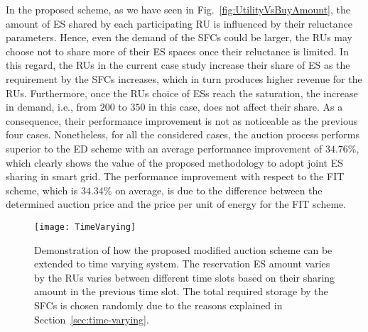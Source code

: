 \documentclass[journal,10pt]{IEEEtran}
\begin{document}
In the proposed scheme, as we have seen in Fig.~\ref{fig:UtilityVsBuyAmount}, the amount of ES shared by each participating RU is influenced by their reluctance parameters. Hence, even the demand of the SFCs could be larger, the RUs may choose not to share more of their ES spaces once their reluctance is limited. In this regard, the RUs in the current case study increase their share of ES as the requirement by the  SFCs increases, which in turn produces higher revenue for the RUs. Furthermore, once the RUs choice of ESs reach the saturation, the increase in demand, i.e., from $200$ to $350$ in this case, does not affect their share. As a consequence, their performance improvement is not as noticeable as the previous four cases. Nonetheless, for all the considered cases, the auction process performs superior to the ED scheme with an average performance improvement of $34.76\%$, which clearly shows the value of the proposed methodology to adopt joint ES sharing in smart grid. The performance improvement with respect to the FIT scheme, which is $34.34\%$ on average, is due to the difference between the determined auction price and the price per unit of energy for the FIT scheme.
\begin{figure}[t!]
\centering
\texttt{[image: TimeVarying]}
\caption{Demonstration of how the proposed modified auction scheme can be extended to time varying system. The reservation ES amount varies by the RUs varies between different time slots based on their sharing amount in the previous time slot. The total required storage by the SFCs is chosen randomly due to the reasons explained in Section~\ref{sec:time-varying}.} \label{fig:time-varying}
\end{figure}
\end{document}

